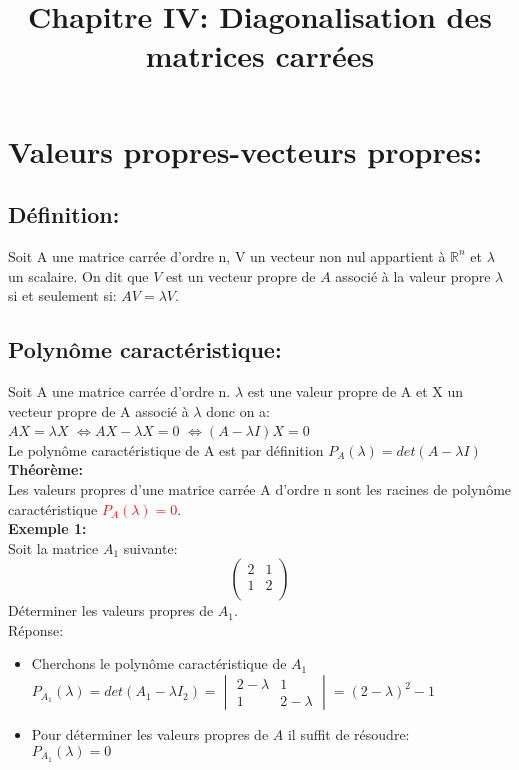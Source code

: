 \documentclass[a4paper,12pt,french]{article}
\date{}
\begin{document}
	
	\title{\textbf{Chapitre IV: Diagonalisation des matrices carrées}}
	\maketitle
	\section{Valeurs propres-vecteurs propres:}
	\subsection{Définition:}
	Soit A une matrice carrée d'ordre n, V un vecteur non nul appartient à $\mathbb{R}^n$ et $\lambda$ un scalaire. On dit que $V$ est un vecteur propre de $A$ associé à la valeur propre $\lambda$ si et seulement si: $AV=\lambda V$.
	\subsection{Polynôme caractéristique:}
	Soit A une matrice carrée d'ordre n. $\lambda$ est une valeur propre de A et X un vecteur propre de A associé à $\lambda$ donc on a:\\
	$AX=\lambda X$
	$\Leftrightarrow $$AX-\lambda X=0$	$\Leftrightarrow $$(A-\lambda I)X=0$\\
	Le polynôme caractéristique de A est par définition $P_{A}(\lambda)=det(A-\lambda I)$\\
	\textbf{Théorème:}\\
	Les valeurs propres d'une matrice carrée A d'ordre n sont les racines de polynôme caractéristique \textcolor{red}{$P_{A}(\lambda)=0$}.\\
	\textbf{Exemple 1:}\\
	Soit la matrice $A_{1}$ suivante:
	\[\begin{pmatrix}
		2 & 1  \\
		1 & 2 \\
		
	\end{pmatrix}\] 
	Déterminer les valeurs propres de $A_{1}$.\\
	Réponse:
	\begin{itemize}
		\item Cherchons le polynôme caractéristique de $A_{1}$\\
		${P_{A_{1}}(\lambda)=det(A_{1}-\lambda I_{2})=\begin{vmatrix}
				
				2-\lambda&1\\
				1&2-\lambda
			\end{vmatrix}=(2-\lambda)^2-1}$ 
		\item Pour déterminer les valeurs propres de $A$ il suffit de résoudre:\\
		$P_{A_{1}}(\lambda)=0$ 
	\end{itemize}
\end{document}
